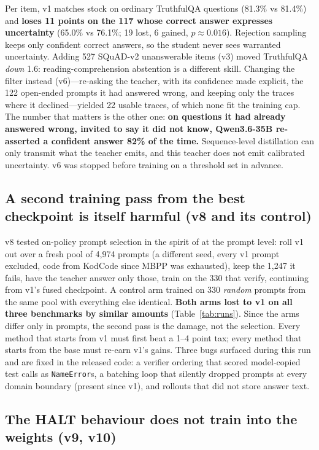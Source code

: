 \documentclass[11pt]{article}
\newcommand{\HALT}{\textsc{HALT}}
\begin{document}
Per item, v1 matches stock on ordinary TruthfulQA questions (81.3\% vs 81.4\%)
and \textbf{loses 11 points on the 117 whose correct answer expresses
uncertainty} (65.0\% vs 76.1\%; 19 lost, 6 gained, $p\approx0.016$).  Rejection
sampling keeps only confident correct answers, so the student never sees
warranted uncertainty.  Adding 527 SQuAD-v2 unanswerable items (v3) moved
TruthfulQA \emph{down} 1.6: reading-comprehension abstention is a different
skill.  Changing the filter instead (v6)---re-asking the teacher, with its
confidence made explicit, the 122 open-ended prompts it had answered wrong, and
keeping only the traces where it declined---yielded 22 usable traces, of which
none fit the training cap.  The number that matters is the other one:
\textbf{on questions it had already answered wrong, invited to say it did not
know, Qwen3.6-35B re-asserted a confident answer 82\% of the time.}
Sequence-level distillation can only transmit what the teacher emits, and this
teacher does not emit calibrated uncertainty.  v6 was stopped before training
on a threshold set in advance.

\subsection{A second training pass from the best checkpoint is itself harmful (v8 and its control)}
\label{sec:v8}

v8 tested on-policy prompt selection in the spirit of \citet{agarwal2023gkd} at
the prompt level: roll v1 out over a fresh pool of 4{,}974 prompts (a different
seed, every v1 prompt excluded, code from KodCode since MBPP was exhausted), keep
the 1{,}247 it fails, have the teacher answer only those, train on the 330 that
verify, continuing from v1's fused checkpoint.  A control arm trained on 330
\emph{random} prompts from the same pool with everything else identical.
\textbf{Both arms lost to v1 on all three benchmarks by similar amounts}
(Table~\ref{tab:runs}).  Since the arms differ only in prompts, the second pass
is the damage, not the selection.  Every method that starts from v1 must first
beat a 1--4 point tax; every method that starts from the base must re-earn v1's
gains.  Three bugs surfaced during this run and are fixed in the released
code: a verifier ordering that scored model-copied test calls as
\texttt{NameError}s, a batching loop that silently dropped prompts at every
domain boundary (present since v1), and rollouts that did not store answer text.

\subsection{The \HALT{} behaviour does not train into the weights (v9, v10)}
\label{sec:v9v10}
\end{document}
